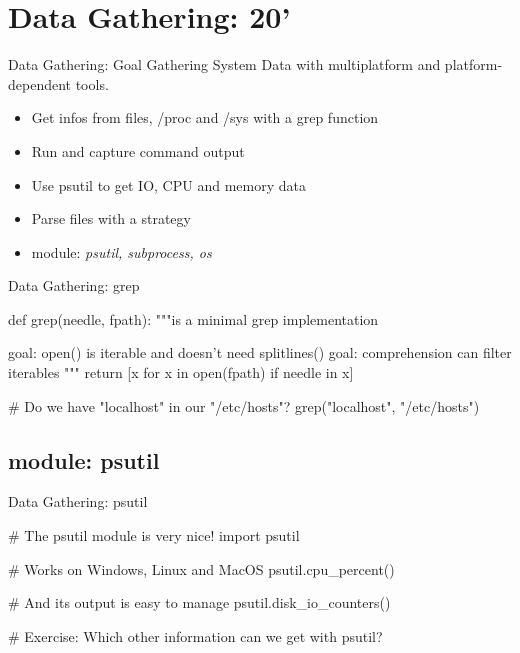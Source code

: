\section{Data Gathering: 20'}
%
%


\begin{frame}{Data Gathering: Goal}
    Gathering System Data with multiplatform
     and platform-dependent tools.
\begin{itemize}
\item Get infos from files, /proc and /sys with a grep function
\item Run and capture command output
\item Use psutil to get IO, CPU and memory data
\item Parse files with a strategy
\item module: \emph{psutil, subprocess, os}
\end{itemize}

\end{frame}


\begin{frame}[fragile]{Data Gathering: grep}
\begin{pythoncode}
def grep(needle, fpath):
    """is a minimal grep implementation

       goal: open() is iterable and doesn't
             need splitlines()
       goal: comprehension can filter iterables
    """
    return [x for x in open(fpath) if needle in x]
    
# Do we have "localhost" in our "/etc/hosts"?
grep("localhost", "/etc/hosts")
\end{pythoncode}
\end{frame}

\subsection{module: psutil}
\begin{frame}[fragile]{Data Gathering: psutil}
\begin{pythoncode}
# The psutil module is very nice!
import psutil

# Works on Windows, Linux and MacOS
psutil.cpu_percent()

# And its output is easy to manage
psutil.disk_io_counters()

# Exercise: Which other information can we get with psutil?
\end{pythoncode}
\end{frame}


